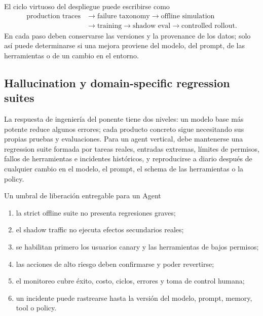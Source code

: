 
El ciclo virtuoso del despliegue puede escribirse como
\[
\begin{aligned}
\text{production traces}&\rightarrow\text{failure taxonomy}
\rightarrow\text{offline simulation}\\
&\rightarrow\text{training}\rightarrow\text{shadow eval}
\rightarrow\text{controlled rollout}.
\end{aligned}
\]
En cada paso deben conservarse las versiones y la provenance de los datos; solo así puede determinarse si una mejora proviene del modelo, del prompt, de las herramientas o de un cambio en el entorno.

\subsection{Hallucination y domain-specific regression suites}

La respuesta de ingeniería del ponente tiene dos niveles: un modelo base más potente reduce algunos errores; cada producto concreto sigue necesitando sus propias pruebas y evaluaciones. Para un agent vertical, debe mantenerse una regression suite formada por tareas reales, entradas extremas, límites de permisos, fallos de herramientas e incidentes históricos, y reproducirse a diario después de cualquier cambio en el modelo, el prompt, el schema de las herramientas o la policy.


\begin{importantbox}{Un umbral de liberación entregable para un Agent}
\begin{enumerate}
  \item la strict offline suite no presenta regresiones graves;
  \item el shadow traffic no ejecuta efectos secundarios reales;
  \item se habilitan primero los usuarios canary y las herramientas de bajos permisos;
  \item las acciones de alto riesgo deben confirmarse y poder revertirse;
  \item el monitoreo cubre éxito, costo, ciclos, errores y toma de control humana;
  \item un incidente puede rastrearse hasta la versión del modelo, prompt, memory, tool o policy.
\end{enumerate}
\end{importantbox}

